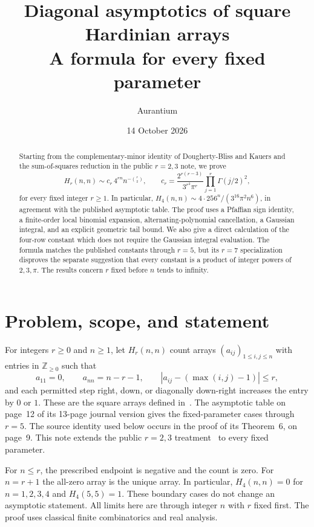 \documentclass[11pt]{article}
\title{Diagonal asymptotics of square Hardinian arrays\\[4pt]
\large A formula for every fixed parameter}
\author{Aurantium}
\date{14 October 2026}
\theoremstyle{remark}
\newcommand{\Z}{\mathbb Z}
\begin{document}
\maketitle
\begin{abstract}
Starting from the complementary-minor identity of Dougherty-Bliss and Kauers
and the sum-of-squares reduction in the public $r=2,3$ note, we prove
\[
 H_r(n,n)\sim c_r\,4^{rn}n^{-\binom r2},\qquad
 c_r=\frac{2^{r(r-3)}}{3^{r^2}\pi^r}
       \prod_{j=1}^r\Gamma(j/2)^2,
\]
for every fixed integer $r\ge1$. In particular,
$H_4(n,n)\sim4\cdot256^n/(3^{16}\pi^2 n^6)$, in agreement with the published asymptotic table.
The proof uses a Pfaffian sign identity, a finite-order local binomial expansion,
alternating-polynomial cancellation, a Gaussian integral, and an explicit
geometric tail bound. We also give a direct calculation of the four-row constant
which does not require the Gaussian integral evaluation. The formula matches
the published constants through $r=5$, but its $r=7$ specialization disproves
the separate suggestion that every constant is a product of integer powers
of $2,3,\pi$. The results concern $r$ fixed before $n$ tends to infinity.
\end{abstract}

\section{Problem, scope, and statement}

For integers $r\ge0$ and $n\ge1$, let $H_r(n,n)$ count arrays
$(a_{ij})_{1\le i,j\le n}$ with entries in $\Z_{\ge0}$ such that
\[
 a_{11}=0,\qquad a_{nn}=n-r-1,
 \qquad |a_{ij}-(\max(i,j)-1)|\le r,
\]
and each permitted step right, down, or diagonally down-right increases the
entry by $0$ or $1$. These are the square arrays defined in~\cite{dk}.
The asymptotic table on page~12 of its 13-page journal version gives the
fixed-parameter cases through $r=5$. The source identity used below occurs
in the proof of its Theorem~6, on page~9. This note extends the public
$r=2,3$ treatment~\cite{prior} to every fixed parameter.

For $n\le r$, the prescribed endpoint is negative and the count is zero. For
$n=r+1$ the all-zero array is the unique array. In particular, $H_4(n,n)=0$ for
$n=1,2,3,4$ and $H_4(5,5)=1$. These boundary cases do not change an asymptotic
statement. All limits here are through integer $n$ with $r$ fixed first. The
proof uses classical finite combinatorics and real analysis.
\end{document}
